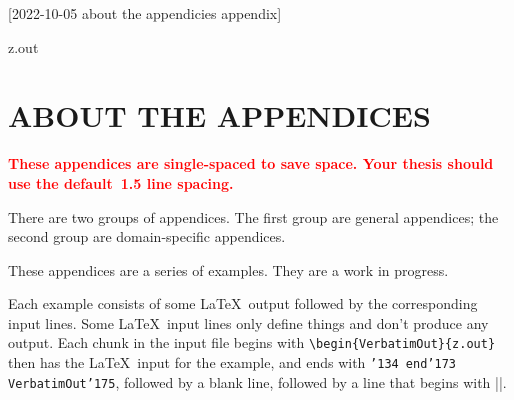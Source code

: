 [2022-10-05 about the appendicies appendix]

\begin{VerbatimOut}{z.out}
\chapter{ABOUT THE APPENDICES}


\textcolor{red}{%
  \textbf{%
    These appendices are single-spaced to save space.
    Your thesis should use the default~1.5 line spacing.%
  }%
}

There are two groups of appendices.
The first group are general appendices;
the second group are domain-specific appendices.

These appendices are a series of examples.
They are a work in progress.

Each example consists of some \LaTeX\ output
followed by the corresponding input lines.
Some \LaTeX\ input lines only define things
and don't produce any output.
Each chunk in the input file begins with
\verb+\begin{VerbatimOut}{z.out}+
then has the \LaTeX\ input for the example,
and ends with {\tt \char'134 end\char'173 VerbatimOut\char'175},
followed by a blank line,
followed by a line that begins with
|\My|.

\end{VerbatimOut}

\MyIO


